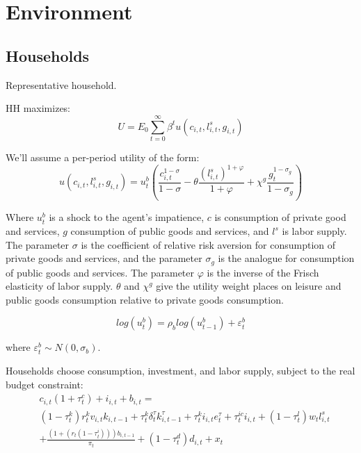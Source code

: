 \documentclass[article,11pt,letterpaper,fleqn]{article}
\theoremstyle{definition}
\numberwithin{equation}{section}
\begin{document}
\section{Environment}
\label{sec:model}

\subsection{Households}
Representative household.

HH maximizes:
\begin{equation}
U=E_{0}\sum_{t=0}^{\infty}\beta^{t}u(c_{i,t},l^{s}_{i,t},g_{i,t})
\end{equation}

We'll assume a per-period utility of the form:
\begin{equation}
u(c_{i,t},l^{s}_{i,t},g_{i,t}) = u^{b}_{t}\left( \frac{c^{1-\sigma}_{i,t}}{1-\sigma}-\theta\frac{(l^{s}_{i,t})^{1+\varphi}}{1+\varphi}+ \chi^{g}\frac{g_{t}^{1-\sigma_{g}}}{1-\sigma_{g}}\right)
\end{equation}

Where $u^{b}_{t}$ is a shock to the agent's impatience, $c$ is consumption of private good and services, $g$ consumption of public goods and services, and $l^{s}$ is labor supply.  The parameter $\sigma$ is the coefficient of relative risk aversion for consumption of private goods and services, and the parameter $\sigma_{g}$ is the analogue for consumption of public goods and services.  The parameter $\varphi$ is the inverse of the Frisch elasticity of labor supply.  $\theta$ and $\chi^{g}$ give the utility weight places on leisure and public goods consumption relative to private goods consumption.  

\begin{equation}
\label{patience_shock}
log(u^{b}_{t}) = \rho_{b}log(u^{b}_{t-1}) + \varepsilon^{b}_{t} 
\end{equation}

where $\varepsilon^{b}_{t} \sim N(0,\sigma_{b})$.

Households choose consumption, investment, and labor supply, subject to the real budget constraint:
\begin{equation}
\label{HH_BC}
\begin{split}
& c_{i,t}(1+\tau^{c}_{t}) + i_{i,t} + b_{i,t}   = \\ 
& (1-\tau^{k}_{t})r^{k}_{t}v_{i,t}k_{i,t-1} + \tau^{k}_{t}\delta^{\tau}_{t}k^{\tau}_{i,t-1} + \tau^{k}_{t}i_{i,t}e^{\tau}_{t} + \tau^{ic}_{t}i_{i,t} + (1-\tau^{l}_{t})w_{t}l^{s}_{i,t} \\ & + \frac{(1+(r_{t}(1-\tau^{i}_{t})))b_{i,t-1}}{\pi_{t}} + (1-\tau^{d}_{t})d_{i,t} + x_{t}  
\end{split}
\end{equation}
\end{document}
